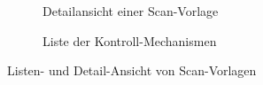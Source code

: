 \documentclass[notables, nomenclature, oneside, 150]{HSMW-Thesis}
\begin{document}
\begin{figure}[th]
\begin{subfigure}[t]{0.3\textwidth}
        			\caption{Detailansicht einer Scan-Vorlage}
        			\label{fig:liste2}
    			\end{subfigure}
    			\begin{subfigure}[t]{0.3\textwidth}
        			\caption{Liste der Kontroll-Mechanismen}
        			\label{fig:liste3}
    			\end{subfigure}
    			\caption{Listen- und Detail-Ansicht von Scan-Vorlagen}
				\label{fig:vorlagen}
			\end{figure}
			
\end{document}

